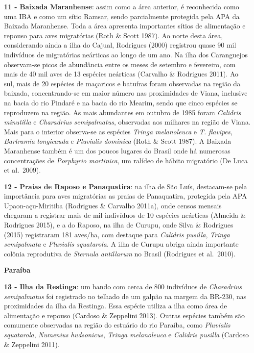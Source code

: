 \documentclass[
  oneside]{scrbook}
\begin{document}
\textbf{11 - Baixada Maranhense}: assim como a área anterior, é reconhecida como uma IBA e como um sítio Ramsar, sendo parcialmente protegida pela APA da Baixada Maranhense. Toda a área apresenta importantes sítios de alimentação e repouso para aves migratórias (Roth \& Scott 1987). Ao norte desta área, considerando ainda a ilha do Cajual, Rodrigues (2000) registrou quase 90 mil indivíduos de migratórias neárticas ao longo de um ano. Na ilha dos Caranguejos observam-se picos de abundância entre os meses de setembro e fevereiro, com mais de 40 mil aves de 13 espécies neárticas (Carvalho \& Rodrigues 2011). Ao sul, mais de 20 espécies de maçaricos e batuíras foram observadas na região da baixada, concentrando-se em maior número nas proximidades de Viana, inclusive na bacia do rio Pindaré e na bacia do rio Mearim, sendo que cinco espécies se reproduzem na região. As mais abundantes em outubro de 1985 foram \emph{Calidris minutilla} e \emph{Charadrius semipalmatus}, observadas aos milhares na região de Viana. Mais para o interior observa-se as espécies \emph{Tringa melanoleuca} e \emph{T. flavipes}, \emph{Bartramia longicauda} e \emph{Pluvialis dominica} (Roth \& Scott 1987). A Baixada Maranhense também é um dos poucos lugares do Brasil onde há numerosas concentrações de \emph{Porphyrio martinica}, um ralídeo de hábito migratório (De Luca et al.~2009).

\textbf{12 - Praias de Raposo e Panaquatira}: na ilha de São Luís, destacam-se pela importância para aves migratórias as praias de Panaquatira, protegida pela APA Upaon-açu-Miritiba (Rodrigues \& Carvalho 2011a), onde censos mensais chegaram a registrar mais de mil indivíduos de 10 espécies neárticas (Almeida \& Rodrigues 2015), e a do Raposo, na ilha de Curupu, onde Silva \& Rodrigues (2015) registraram 181 aves/ha, com destaque para \emph{Calidris pusilla}, \emph{Tringa semipalmata} e \emph{Pluvialis squatarola}. A ilha de Curupu abriga ainda importante colônia reprodutiva de \emph{Sternula antillarum} no Brasil (Rodrigues et al.~2010).

\textbf{Paraíba}

\textbf{13 - Ilha da Restinga}: um bando com cerca de 800 indivíduos de \emph{Charadrius semipalmatus} foi registrado no telhado de um galpão na margem da BR-230, nas proximidades da ilha da Restinga. Essa espécie utiliza a ilha como área de alimentação e repouso (Cardoso \& Zeppelini 2013). Outras espécies também são comumente observadas na região do estuário do rio Paraíba, como \emph{Pluvialis squatarola}, \emph{Numenius hudsonicus}, \emph{Tringa melanoleuca} e \emph{Calidris pusilla} (Cardoso \& Zeppelini 2011).
\end{document}
